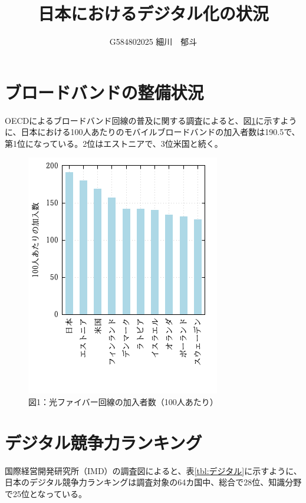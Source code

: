 \documentclass[a4paper,11pt,dvipdfmx]{ujarticle}
\title{日本におけるデジタル化の状況}
\author{G584802025 細川　郁斗}
\begin{document}
\maketitle %

\section{ブロードバンドの整備状況}
OECDによるブロードバンド回線の普及に関する調査\cite{oecd}によると、図\ref{fig:ランキング}に示すように、日本における100人あたりのモバイルブロードバンドの加入者数は190.5で、第1位になっている。2位はエストニアで、3位米国と続く。



 \begin{figure}[htbp]
    \centering
    \includegraphics{fig21.png}
    \caption{図1：光ファイバー回線の加入者数（100人あたり）}\label{fig:ランキング}
\end{figure}

\section{デジタル競争力ランキング}
国際経営開発研究所（IMD）の調査図\cite{IMD}によると、表\ref{tbl:デジタル}に示すように、日本のデジタル競争力ランキングは調査対象の64カ国中、総合で28位、知識分野で25位となっている。
\end{document}
